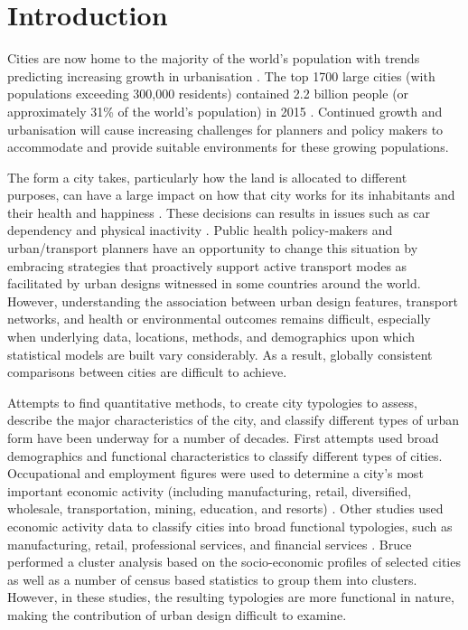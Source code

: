 \documentclass[10pt,letterpaper,hidelinks]{article}
\begin{document}
\listoftodos


\linenumbers



\section*{Introduction}\label{sec:introduction}

Cities are now home to the majority of the world's population with trends predicting increasing growth in urbanisation \cite{UNDESA2015,WHO2016,ABS2008}. The top 1700 large cities (with populations exceeding 300,000 residents) contained 2.2 billion people (or approximately 31\% of the world's population) in 2015 \cite{UN2014}. Continued growth and urbanisation will cause increasing challenges for planners and policy makers to accommodate and provide suitable environments for these growing populations.

The form a city takes, particularly how the land is allocated to different purposes, can have a large impact on how that city works for its inhabitants and their health and happiness \cite{Giles-corti2016,Kleinert2016,Goenka2016,Zapata-Diomedi2017}. These decisions can results in issues such as car dependency \cite{Heesch2014,Daley2011} and physical inactivity \cite{Cepeda2016,MingWen2008,Norman2006}. Public health policy-makers and urban/transport planners have an opportunity to change this situation by embracing strategies that proactively support active transport modes as facilitated by urban designs witnessed in some countries around the world. However, understanding the association between urban design features, transport networks, and health or environmental outcomes remains difficult, especially when underlying data, locations, methods, and demographics upon which statistical models are built vary considerably. As a result, globally consistent comparisons between cities are difficult to achieve. 

Attempts to find quantitative methods, to create city typologies to assess, describe the major characteristics of the city, and classify different types of urban form have been underway for a number of decades. First attempts used broad demographics and functional characteristics to classify different types of cities. Occupational and employment figures were used to determine a city's most important economic activity (including manufacturing, retail, diversified, wholesale, transportation, mining, education, and resorts) \cite{Harris1943}. Other studies used economic activity data to classify cities into broad functional typologies, such as manufacturing, retail, professional services, and financial services \cite{Nelson1955}. Bruce \cite{Bruce1971} performed a cluster analysis based on the socio-economic profiles of selected cities as well as a number of census based statistics to group them into clusters. However, in these studies, the resulting typologies are more functional in nature, making the contribution of urban design difficult to examine.
\end{document}
